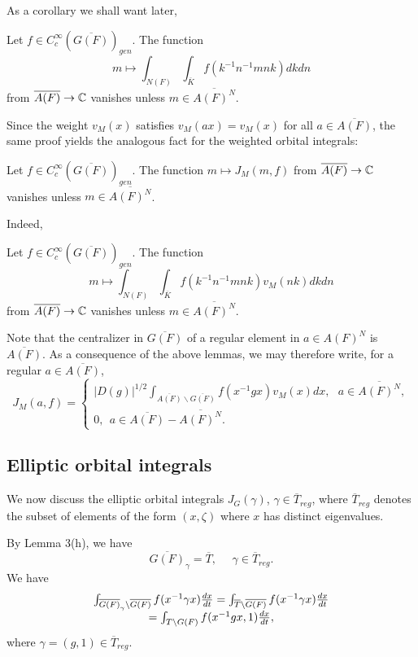 As a corollary we shall want later,

\begin{lemma}
Let $f\in C_c^\infty (\overline{G(F)})_{gen}$. The function 
\[
m\longmapsto \int_{N(F)}\int_{\overline{K}}f(k^{-1}n^{-1}mnk)dkdn
\]
from $\overline{A(F)}\rightarrow {\Bbb C}$ vanishes unless
$m\in \overline{A(F)^N}$.
\end{lemma}

Since the weight $v_M(x)$ satisfies $v_M(ax)=v_M(x)$ for
all $a\in\overline{A(F)}$, the same proof yields the analogous
fact for the weighted orbital integrals:

\begin{lemma}
Let $f\in C_c^\infty (\overline{G(F)})_{gen}$. The function
$m\longmapsto J_M(m,f)$ from $\overline{A(F)}\rightarrow {\Bbb C}$
vanishes unless $m\in \overline{A(F)^N}$.
\end{lemma}

Indeed,
\begin{lemma}
Let $f\in C_c^\infty (\overline{G(F)})_{gen}$. The function 
\[
m\longmapsto
\int_{N(F)}\int_{\overline{K}}f(k^{-1}n^{-1}mnk)v_M(nk)dkdn
\]
from $\overline{A(F)}\rightarrow {\Bbb C}$ vanishes unless
$m\in \overline{A(F)^N}$.
\end{lemma}

Note that the centralizer in $\overline{G(F)}$ of a regular element
in $a\in A(F)^N$ is $\overline{A(F)}$. As a consequence of the
above lemmas, we may therefore write,
for a regular $a\in \overline{A(F)}$,
\begin{equation}
J_M(a,f)=
\left\{
\begin{array}{c}
|D(g)|^{1/2}\int_{\overline{A(F)}\backslash \overline{G(F)}}
f(x^{-1}gx)v_M(x)dx,\ \ \ a\in \overline{A(F)^N},\\
0,\ \ a\in \overline{A(F)}- \overline{A(F)^N}.
\end{array}
\right.
\end{equation}

\subsection{Elliptic orbital integrals}

We now discuss the elliptic orbital integrals $J_G(\gamma)$,
$\gamma\in \overline{T}_{reg}$, where $\overline{T}_{reg}$
denotes the subset of elements of the form $(x,\zeta)$
where $x$ has distinct eigenvalues.

By Lemma 3(h), we have
\[
\overline{G(F)}_\gamma
=\overline{T},\ \ \ \ \ \
\gamma\in \overline{T}_{reg}.
\]
We have
\begin{equation}
\begin{array}{c}
\int_{\overline{G(F)}_\gamma\backslash \overline{G(F)}}
f(x^{-1}\gamma x){dx\over dt}
=\int_{\overline{T}\backslash \overline{G(F)}}
f(x^{-1}\gamma x){dx\over dt}\\
=\int_{T\backslash G(F)}
f(x^{-1}gx,1){dx\over dt},
\end{array}
\end{equation}
where $\gamma =(g,1)\in \overline{T}_{reg}$.

